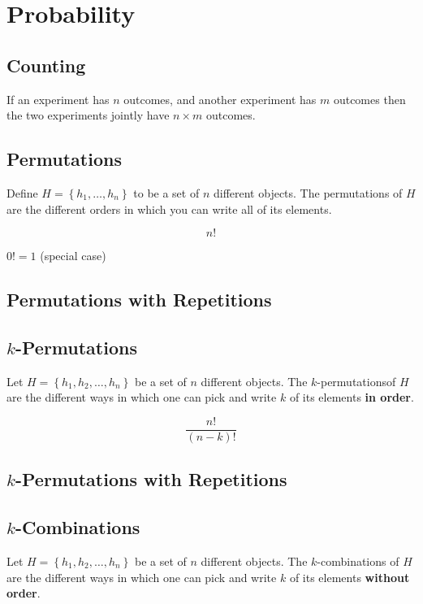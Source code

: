 \section{Probability}

\subsection*{Counting}

If an experiment has $n$ outcomes, and another experiment has $m$ outcomes then the two experiments jointly have $n\times m$ outcomes.

\subsection*{Permutations}

Define $H = \left\{h_1, \dots, h_n\right\}$ to be a set of $n$ different objects. The permutations of $H$ are the different orders in which you can write all of its elements.

$$ n! $$

$ 0! = 1 $ (special case)

\subsection*{Permutations with Repetitions}



\subsection*{$k$-Permutations}

Let $H = \left\{h_1, h_2, \dots, h_n\right\}$ be a set of $n$ different objects. The $k$-permutationsof $H$ are the different ways in which one can pick and write $k$ of its elements \textbf{in order}.

$$ \frac{n!}{(n-k)!} $$


\subsection*{$k$-Permutations with Repetitions}



\subsection*{$k$-Combinations}

Let $H = \left\{h_1, h_2, \dots, h_n\right\}$ be a set of $n$ different objects. The $k$-combinations of $H$ are the different ways in which one can pick and write $k$ of its elements \textbf{without order}.

